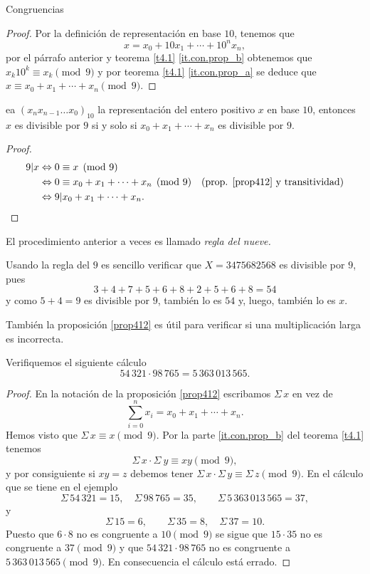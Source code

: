 \begin{section}{Congruencias}
\begin{proof}
Por la definición de representación en base $10$, tenemos que 
$$x=x_0 + 10x_1+ \cdots+10^nx_n,$$ 
por el párrafo anterior y teorema \ref{t4.1} \ref{it.con.prop_b}   obtenemos que $x_k10^k \equiv x_k \pmod{9}$ y por
teorema \ref{t4.1} \ref{it.con.prop_a}  se deduce que $x \equiv
x_0+x_1+\cdots+x_n \pmod{9}$.
\end{proof}

 \begin{corolario} ea $(x_nx_{n-1}\ldots x_0)_{10}$ la representación del entero positivo $x$ en base $10$, entonces $x$ es divisible por $9$ si y solo si $ x_0+x_1+\cdots+x_n$ es divisible por $9$.
 \end{corolario}
 \begin{proof}
    \begin{align*}
        9 | x &\Leftrightarrow 0 \equiv x  \pmod{9}&& \\
        &\Leftrightarrow 0 \equiv x_0+x_1+\cdots+x_n\pmod{9}&&\text{(prop. \ref{prop412} y transitividad)} \\
        &\Leftrightarrow 9 | x_0+x_1+\cdots+x_n.
    \end{align*}
 \end{proof}
 El procedimiento anterior a veces es llamado \textit{regla del nueve.}

\begin{ejemplo*} Usando la regla del $9$  es sencillo verificar que $X= 3475682568$ es divisible por $9$, pues 
    $$
    3+4+7+5+6+8+2+5+6+8 = 54
    $$
    y como $5+4=9$ es divisible por $9$, también lo es  $54$ y, luego, también lo es $x$. 
\end{ejemplo*}

También la proposición \ref{prop412} es útil para verificar si una multiplicación larga es incorrecta. 

\begin{ejemplo*} Verifiquemos  el siguiente cálculo
$$
54\,321 \cdot 98\,765= 5\,363\,013\,565.
$$
\end{ejemplo*}
\begin{proof}
En la notación de la proposición \ref{prop412} escribamos $\Sigma\, x$ en vez de $$\sum_{i=0}^n x_i = x_0+x_1+\cdots+x_n.$$
Hemos visto que $\Sigma\, x \equiv x \pmod{9}$. Por la parte \ref{it.con.prop_b}  del
teorema \ref{t4.1} tenemos
$$
\Sigma\, x \cdot\Sigma\ y \equiv xy \pmod{9},
$$
y por consiguiente si $xy=z$ debemos tener $\Sigma\, x \cdot \Sigma\, y \equiv\Sigma\, z \pmod{9}$. 
En el cálculo que se tiene en el ejemplo
$$
\Sigma\, 54\,321=15,\quad \Sigma\, 98\,765=35,\qquad \Sigma\, 5\,363\,013\,565=37,
$$
y
$$
\Sigma\, 15=6, \qquad \Sigma\, 35=8,\quad \Sigma\, 37=10.
$$
Puesto que $6 \cdot 8$ no es congruente a $10 \pmod{9}$ se sigue
que $15 \cdot 35$ no es congruente a $37 \pmod{9}$ y que $54\,321
\cdot 98\,765$ no es congruente a $5\,363\,013\,565\pmod{9}$. En
consecuencia el cálculo está errado.
\end{proof}


\end{section}
